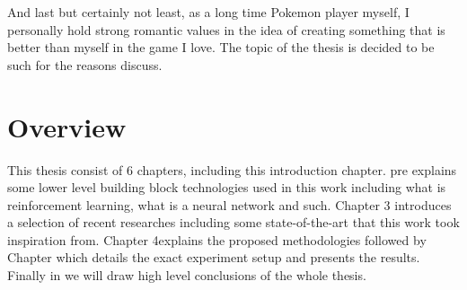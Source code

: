 And last but certainly not least, as a long time Pokemon player myself, I
personally hold strong romantic values in the idea of creating something that
is better than myself in the game I love. The topic of the thesis is decided to
be such for the reasons discuss.


\section{Overview}
This thesis consist of 6 chapters, including this introduction chapter.
 pre explains some lower level building block
technologies used in this work including what is reinforcement learning, what
is a neural network and such. Chapter 3  introduces a selection
of recent researches including some state-of-the-art that this work took
inspiration from. Chapter 4explains the proposed methodologies
followed by Chapter which details the exact experiment setup
and presents the results. Finally in we will draw high
level conclusions of the whole thesis.


